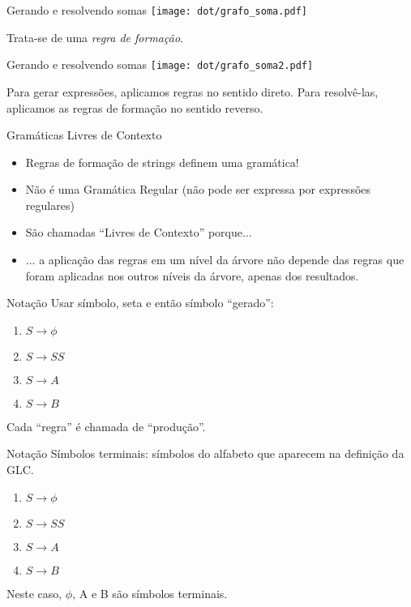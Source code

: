 \documentclass{beamer}
\begin{document}
\begin{frame}{Gerando e resolvendo somas}
\large
\centering
  \texttt{[image: dot/grafo\_soma.pdf]}

  Trata-se de uma \textit{regra de formação}.
\end{frame}


\begin{frame}{Gerando e resolvendo somas}
\large
\centering
  \texttt{[image: dot/grafo\_soma2.pdf]}

Para gerar expressões, aplicamos regras no sentido direto. Para resolvê-las,
  aplicamos as regras de formação no sentido reverso.
\end{frame}

\begin{frame}{Gramáticas Livres de Contexto}
\large
\centering
  \begin{itemize}
  \item Regras de formação de strings definem uma gramática!
  \item Não é uma Gramática Regular (não pode ser expressa por expressões
    regulares)
  \item São chamadas ``Livres de Contexto'' porque...
  \item <2-> ... a aplicação das regras em um nível da árvore não depende das
    regras que foram aplicadas nos outros níveis da árvore, apenas dos
      resultados.
  \end{itemize}
\end{frame}

\begin{frame}{Notação}
\Large
  Usar símbolo, seta e então símbolo ``gerado'':
  \begin{enumerate}
  \item $S \rightarrow \phi$
  \item $S \rightarrow S S$
  \item $S \rightarrow A$
  \item $S \rightarrow B$
  \end{enumerate}
  Cada ``regra'' é chamada de ``produção''.
\end{frame}

\begin{frame}{Notação}
\Large
  Símbolos terminais: símbolos do alfabeto que aparecem na definição da GLC.
  \begin{enumerate}
  \item $S \rightarrow \phi$
  \item $S \rightarrow S S$
  \item $S \rightarrow A$
  \item $S \rightarrow B$
  \end{enumerate}
  Neste caso, $\phi$, A e B são símbolos terminais.
\end{frame}
\end{document}
